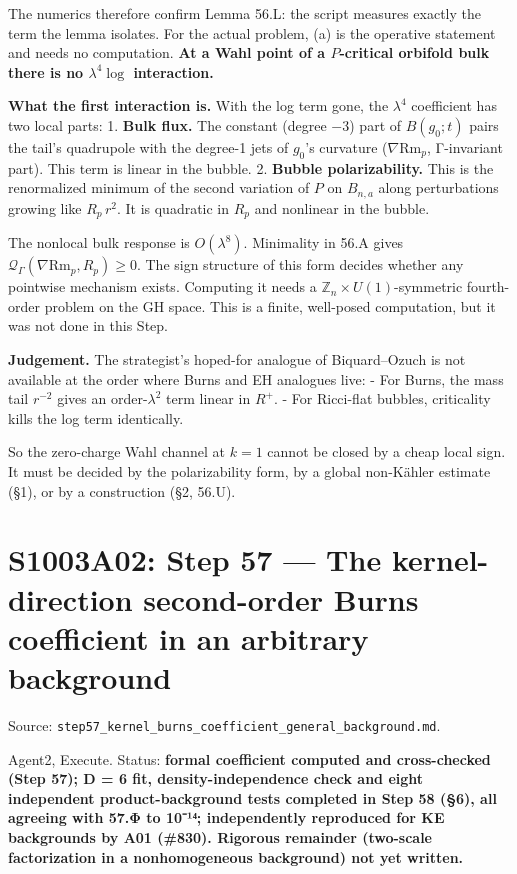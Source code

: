 \documentclass[
  10pt,
]{report}
\begin{document}
The numerics therefore confirm Lemma 56.L: the script measures exactly
the term the lemma isolates. For the actual problem, (a) is the
operative statement and needs no computation. \textbf{At a Wahl point of
a \(P\)-critical orbifold bulk there is no \(\lambda^4\log\)
interaction.}

\textbf{What the first interaction is.} With the log term gone, the
\(\lambda^4\) coefficient has two local parts: 1. \textbf{Bulk flux.}
The constant (degree \(-3\)) part of \(B(g_0;t)\) pairs the tail's
quadrupole with the degree-1 jets of \(g_0\)'s curvature
(\(\nabla\mathrm{Rm}_p\), Γ-invariant part). This term is linear in the
bubble. 2. \textbf{Bubble polarizability.} This is the renormalized
minimum of the second variation of \(P\) on \(B_{n,a}\) along
perturbations growing like \(R_p\,r^2\). It is quadratic in \(R_p\) and
nonlinear in the bubble.

The nonlocal bulk response is \(O(\lambda^8)\). Minimality in 56.A gives
\(\mathcal Q_\Gamma(\nabla\mathrm{Rm}_p,R_p)\ge0\). The sign structure
of this form decides whether any pointwise mechanism exists. Computing
it needs a \(\mathbb Z_n\times U(1)\)-symmetric fourth-order problem on
the GH space. This is a finite, well-posed computation, but it was not
done in this Step.

\textbf{Judgement.} The strategist's hoped-for analogue of
Biquard--Ozuch is not available at the order where Burns and EH
analogues live: - For Burns, the mass tail \(r^{-2}\) gives an
order-\(\lambda^2\) term linear in \(R^+\). - For Ricci-flat bubbles,
criticality kills the log term identically.

So the zero-charge Wahl channel at \(k=1\) cannot be closed by a cheap
local sign. It must be decided by the polarizability form, by a global
non-Kähler estimate (§1), or by a construction (§2, 56.U).

\hypertarget{s1003a02-step-57-the-kernel-direction-second-order-burns-coefficient-in-an-arbitrary-background}{%
\chapter{S1003A02: Step 57 --- The kernel-direction second-order Burns
coefficient in an arbitrary
background}\label{s1003a02-step-57-the-kernel-direction-second-order-burns-coefficient-in-an-arbitrary-background}}

Source:
\texttt{step57\_kernel\_burns\_coefficient\_general\_background.md}.

Agent2, Execute. Status: \textbf{formal coefficient computed and
cross-checked (Step 57); D = 6 fit, density-independence check and eight
independent product-background tests completed in Step 58 (§6), all
agreeing with 57.Φ to 10⁻¹⁴; independently reproduced for KE backgrounds
by A01 (\#830). Rigorous remainder (two-scale factorization in a
nonhomogeneous background) not yet written.}
\end{document}
